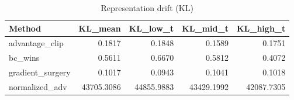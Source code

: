 \begin{table}[htbp]
\centering
\caption{Representation drift (KL)}
\label{tab:repr-drift}
\begin{tabular}{lrrrr}
\toprule
\textbf{Method} & \textbf{KL\_mean} & \textbf{KL\_low\_t} & \textbf{KL\_mid\_t} & \textbf{KL\_high\_t} \\
\midrule
advantage\_clip & 0.1817 & 0.1848 & 0.1589 & 0.1751 \\
bc\_wins & 0.5611 & 0.6670 & 0.5812 & 0.4072 \\
gradient\_surgery & 0.1017 & 0.0943 & 0.1041 & 0.1018 \\
normalized\_adv & 43705.3086 & 44855.9883 & 43429.1992 & 42087.7305 \\
\bottomrule
\end{tabular}
\end{table}